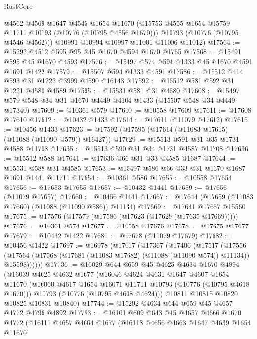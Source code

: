 \begin{lexlean}{RustCore}
\begin{coremodule}
        @4562
        @4569
        @1647
        @4545
        @1654
        @11670
        (@15753 @4555 @1654 @15759 @11711 @10793 (@10776 (@10795 @4556 @1670)))
        @10793
        (@10776 (@10795 @4546 @4562)))
      @10991
      @10994
      @10997
      @11001
      @11006
      @11012)
@17564 := @15292 @4572 @595 @95 @45 @1670 @4594 @1670 @1765
@17568 := @15491 @595 @45 @1670 @4593
@17576 := @15497 @574 @594 @1333 @45 @1670 @4591 @1691 @1422
@17579 := @15507 @594 @1333 @4591
@17586 := @15512 @414 @593 @31 @1222 @3999 @4590 @16143
@17592 := @15512 @581 @592 @31 @1221 @4580 @4589
@17595 := @15531 @581 @31 @4580
@17608 := @15497 @579 @548 @34 @31 @1670 @4449 @4104 @1433 (@15507 @548 @34 @4449 @17340)
@17609 := @10361 @579
@17610 := @10558 @17609
@17611 := @17608 @17610
@17612 := @10432 @1433
@17614 := @17611 (@11079 @17612)
@17615 := @10456 @1433
@17623 := @17592 (@17595 (@17614 (@11083 @17615) (@11088 (@11090 @579)) @16427))
@17629 := @15513 @591 @31 @35 @1731 @4588 @11708
@17635 := @15513 @590 @31 @34 @1731 @4587 @11708
@17636 := @15512 @588
@17641 := @17636 @66 @31 @33 @4585 @1687
@17644 := @15531 @588 @31 @4585
@17653 := @15497 @586 @66 @33 @31 @1670 @1687 @1691 @1441 @11711
@17654 := @10361 @586
@17655 := @10558 @17654
@17656 := @17653 @17655
@17657 := @10432 @1441
@17659 := @17656 (@11079 @17657)
@17660 := @10456 @1441
@17667 := @17644 (@17659 (@11083 @17660) (@11088 (@11090 @586)) @11134)
@17669 := @17641 @17667 @15560
@17675 := @17576 (@17579 (@17586 (@17623 (@17629 (@17635 @17669)))))
@17676 := @10361 @574
@17677 := @10558 @17676
@17678 := @17675 @17677
@17679 := @10432 @1422
@17681 := @17678 (@11079 @17679)
@17682 := @10456 @1422
@17697 := @16978
    (@17017
      (@17367
        (@17406
          (@17517
            (@17556
              (@17564 (@17568 (@17681 (@11083 @17682) (@11088 (@11090 @574)) @11134)) @15598))))))
@17736 := @16029
    @644
    @659
    @45
    @4625
    @4634
    @1670
    @4894
    (@16039
      @4625
      @4632
      @1677
      (@16046
        @4624
        @4631
        @1647
        @4607
        @1654
        @11670
        (@16060 @4617 @1654 @16071 @11711 @10793 (@10776 (@10795 @4618 @1670)))
        @10793
        (@10776 (@10795 @4608 @4624)))
      @10811
      @10815
      @10820
      @10825
      @10831
      @10840)
@17744 := @15292 @4634 @644 @659 @45 @4657 @4772 @4796 @4892
@17783 := @16101
    @609
    @643
    @45
    @4657
    @4666
    @1670
    @4772
    (@16111
      @4657
      @4664
      @1677
      (@16118
        @4656
        @4663
        @1647
        @4639
        @1654
        @11670

\end{coremodule}
\end{lexlean}
